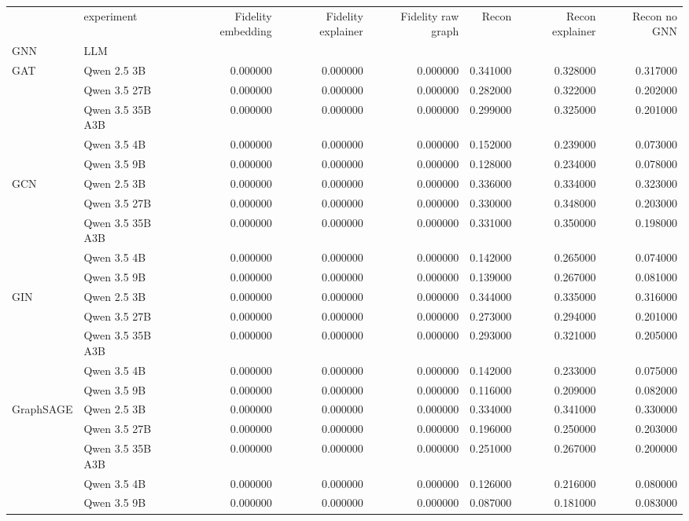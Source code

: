 \begin{tabular}{llrrrrrr}
\toprule
 & experiment & Fidelity embedding & Fidelity explainer & Fidelity raw graph & Recon & Recon explainer & Recon no GNN \\
GNN & LLM &  &  &  &  &  &  \\
\midrule
\multirow[t]{5}{*}{GAT} & Qwen 2.5 3B & 0.000000 & 0.000000 & 0.000000 & 0.341000 & 0.328000 & 0.317000 \\
 & Qwen 3.5 27B & 0.000000 & 0.000000 & 0.000000 & 0.282000 & 0.322000 & 0.202000 \\
 & Qwen 3.5 35B A3B & 0.000000 & 0.000000 & 0.000000 & 0.299000 & 0.325000 & 0.201000 \\
 & Qwen 3.5 4B & 0.000000 & 0.000000 & 0.000000 & 0.152000 & 0.239000 & 0.073000 \\
 & Qwen 3.5 9B & 0.000000 & 0.000000 & 0.000000 & 0.128000 & 0.234000 & 0.078000 \\
\cline{1-8}
\multirow[t]{5}{*}{GCN} & Qwen 2.5 3B & 0.000000 & 0.000000 & 0.000000 & 0.336000 & 0.334000 & 0.323000 \\
 & Qwen 3.5 27B & 0.000000 & 0.000000 & 0.000000 & 0.330000 & 0.348000 & 0.203000 \\
 & Qwen 3.5 35B A3B & 0.000000 & 0.000000 & 0.000000 & 0.331000 & 0.350000 & 0.198000 \\
 & Qwen 3.5 4B & 0.000000 & 0.000000 & 0.000000 & 0.142000 & 0.265000 & 0.074000 \\
 & Qwen 3.5 9B & 0.000000 & 0.000000 & 0.000000 & 0.139000 & 0.267000 & 0.081000 \\
\cline{1-8}
\multirow[t]{5}{*}{GIN} & Qwen 2.5 3B & 0.000000 & 0.000000 & 0.000000 & 0.344000 & 0.335000 & 0.316000 \\
 & Qwen 3.5 27B & 0.000000 & 0.000000 & 0.000000 & 0.273000 & 0.294000 & 0.201000 \\
 & Qwen 3.5 35B A3B & 0.000000 & 0.000000 & 0.000000 & 0.293000 & 0.321000 & 0.205000 \\
 & Qwen 3.5 4B & 0.000000 & 0.000000 & 0.000000 & 0.142000 & 0.233000 & 0.075000 \\
 & Qwen 3.5 9B & 0.000000 & 0.000000 & 0.000000 & 0.116000 & 0.209000 & 0.082000 \\
\cline{1-8}
\multirow[t]{5}{*}{GraphSAGE} & Qwen 2.5 3B & 0.000000 & 0.000000 & 0.000000 & 0.334000 & 0.341000 & 0.330000 \\
 & Qwen 3.5 27B & 0.000000 & 0.000000 & 0.000000 & 0.196000 & 0.250000 & 0.203000 \\
 & Qwen 3.5 35B A3B & 0.000000 & 0.000000 & 0.000000 & 0.251000 & 0.267000 & 0.200000 \\
 & Qwen 3.5 4B & 0.000000 & 0.000000 & 0.000000 & 0.126000 & 0.216000 & 0.080000 \\
 & Qwen 3.5 9B & 0.000000 & 0.000000 & 0.000000 & 0.087000 & 0.181000 & 0.083000 \\
\cline{1-8}
\bottomrule
\end{tabular}
